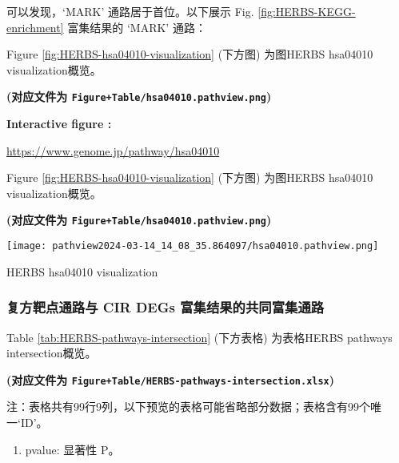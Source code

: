 \documentclass[
]{article}
\providecommand{\tightlist}{%
  \setlength{\itemsep}{0pt}\setlength{\parskip}{0pt}}
\begin{document}
可以发现，`MARK' 通路居于首位。以下展示 Fig. \ref{fig:HERBS-KEGG-enrichment} 富集结果的 `MARK' 通路：

Figure \ref{fig:HERBS-hsa04010-visualization} (下方图) 为图HERBS hsa04010 visualization概览。

\textbf{(对应文件为 \texttt{Figure+Table/hsa04010.pathview.png})}

\begin{center}\begin{tcolorbox}[colback=gray!10, colframe=gray!50, width=0.9\linewidth, arc=1mm, boxrule=0.5pt]
\textbf{
Interactive figure
:}

\vspace{0.5em}

    \url{https://www.genome.jp/pathway/hsa04010}

\vspace{2em}
\end{tcolorbox}
\end{center}

Figure \ref{fig:HERBS-hsa04010-visualization} (下方图) 为图HERBS hsa04010 visualization概览。

\textbf{(对应文件为 \texttt{Figure+Table/hsa04010.pathview.png})}

\def\@captype{figure}
\begin{center}
\texttt{[image: pathview2024-03-14\_14\_08\_35.864097/hsa04010.pathview.png]}
\caption{HERBS hsa04010 visualization}\label{fig:HERBS-hsa04010-visualization}
\end{center}

\hypertarget{ux590dux65b9ux9776ux70b9ux901aux8defux4e0e-cir-degs-ux5bccux96c6ux7ed3ux679cux7684ux5171ux540cux5bccux96c6ux901aux8def}{%
\subsubsection{复方靶点通路与 CIR DEGs 富集结果的共同富集通路}\label{ux590dux65b9ux9776ux70b9ux901aux8defux4e0e-cir-degs-ux5bccux96c6ux7ed3ux679cux7684ux5171ux540cux5bccux96c6ux901aux8def}}

Table \ref{tab:HERBS-pathways-intersection} (下方表格) 为表格HERBS pathways intersection概览。

\textbf{(对应文件为 \texttt{Figure+Table/HERBS-pathways-intersection.xlsx})}

\begin{center}\begin{tcolorbox}[colback=gray!10, colframe=gray!50, width=0.9\linewidth, arc=1mm, boxrule=0.5pt]注：表格共有99行9列，以下预览的表格可能省略部分数据；表格含有99个唯一`ID'。
\end{tcolorbox}
\end{center}
\begin{center}\begin{tcolorbox}[colback=gray!10, colframe=gray!50, width=0.9\linewidth, arc=1mm, boxrule=0.5pt]\begin{enumerate}\tightlist
\item pvalue:  显著性 P。
\end{enumerate}\end{tcolorbox}
\end{center}
\end{document}
